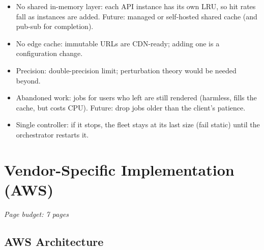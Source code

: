 \documentclass[a4paper,12pt]{article}
\newcommand{\budget}[1]{\hfill{\small\textcolor{mutedText}{\emph{Page budget: #1}}}\par}
\begin{document}
\begin{yourwriting}
\begin{itemize}
    \item No shared in-memory layer: each API instance has its own LRU, so hit rates fall as instances are added. Future: managed or self-hosted shared cache (and pub-sub for completion).
    \item No edge cache: immutable URLs are CDN-ready; adding one is a configuration change.
    \item Precision: double-precision limit; perturbation theory would be needed beyond.
    \item Abandoned work: jobs for users who left are still rendered (harmless, fills the cache, but costs CPU). Future: drop jobs older than the client's patience.
    \item Single controller: if it stops, the fleet stays at its last size (fail static) until the orchestrator restarts it.
\end{itemize}
\end{yourwriting}

\newpage
\section{Vendor-Specific Implementation (AWS)}
\label{sec:aws}
\budget{7 pages}

\subsection{AWS Architecture}
\end{document}
